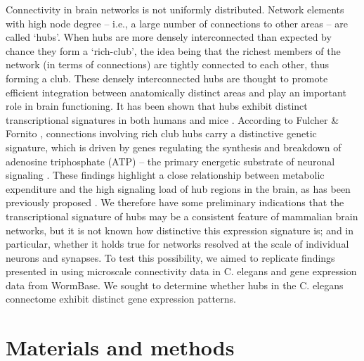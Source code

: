 \documentclass[10pt,letterpaper]{article}
\begin{document}
Connectivity in brain networks is not uniformly distributed. Network elements with high node degree – i.e., a large number of connections to other areas – are called `hubs'.
When hubs are more densely interconnected than expected by chance they form a `rich-club', the idea being that the richest members of the network (in terms of connections) are tightly connected to each other, thus forming a club.
These densely interconnected hubs are thought to promote efficient integration between anatomically distinct areas and play an important role in brain functioning.
It has been shown that hubs exhibit distinct transcriptional signatures in both humans \cite{Vertes2016a} and mice \cite{Fulcher2015}.
According to Fulcher \& Fornito \cite{Fulcher2015}, connections involving rich club hubs carry a distinctive genetic signature, which is driven by genes regulating the synthesis and breakdown of adenosine triphosphate (ATP) – the primary energetic substrate of neuronal signaling \cite{Fulcher2015}. These findings highlight a close relationship between metabolic expenditure and the high signaling load of hub regions in the brain, as has been previously proposed \cite{Bullmore2012}.
We therefore have some preliminary indications that the transcriptional signature of hubs may be a consistent feature of mammalian brain networks, but it is not known how distinctive this expression signature is; and in particular, whether it holds true for networks resolved at the scale of individual neurons and synapses.
To test this possibility, we aimed to replicate findings presented in \cite{Fulcher2015} using microscale connectivity data in C. elegans and gene expression data from WormBase.
We sought to determine whether hubs in the C. elegans connectome exhibit distinct gene expression patterns.\\



\section*{Materials and methods}
\end{document}
